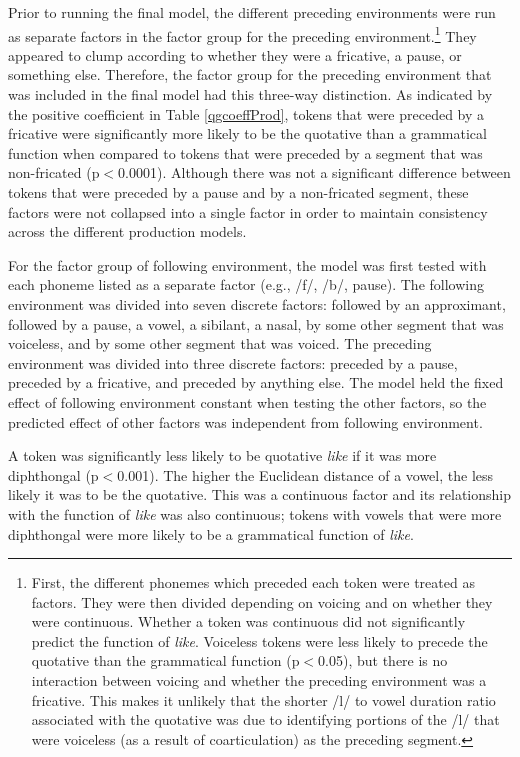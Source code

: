Prior to running the final model, the different preceding environments were run as separate factors in the factor group for the preceding environment.\footnote{First, the different phonemes which preceded each token were treated as factors.  They were then divided depending on voicing and on whether they were continuous.  Whether a token was continuous did not significantly predict the function of \textit{like}.  Voiceless tokens were less likely to precede the quotative than the grammatical function (p$<$0.05), but there is no interaction between voicing and whether the preceding environment was a fricative.  This makes it unlikely that the shorter /l/ to vowel duration ratio associated with the quotative was due to identifying portions of the /l/ that were voiceless (as a result of coarticulation) as the preceding segment.}  They appeared to clump according to whether they were a fricative, a pause, or something else.  Therefore, the factor group for the preceding environment that was included in the final model had this three-way distinction.  As indicated by the positive coefficient in Table \ref{qgcoeffProd}, tokens that were preceded by a fricative were significantly more likely to be the quotative than a grammatical function when compared to tokens that were preceded by a segment that was non-fricated (p$<$0.0001).  Although there was not a significant difference between tokens that were preceded by a pause and by a non-fricated segment, these factors were not collapsed into a single factor in order to maintain consistency across the different production models.

For the factor group of following environment, the model was first tested with each phoneme listed as a separate factor (e.g., /f/, /b/, pause).  The following environment was divided into seven discrete factors: followed by an approximant, followed by a pause, a vowel, a sibilant, a nasal, by some other segment that was voiceless, and by some other segment that was voiced.  The preceding environment was divided into three discrete factors: preceded by a pause, preceded by a fricative, and preceded by anything else.  The model held the fixed effect of following environment constant when testing the other factors, so the predicted effect of other factors was independent from following environment.  

A token was significantly less likely to be quotative \textit{like} if it was more diphthongal (p$<$0.001).  The higher the Euclidean distance of a vowel, the less likely it was to be the quotative. This was a continuous factor and its relationship with the function of \textit{like} was also continuous; tokens with vowels that were more diphthongal were more likely to be a grammatical function of \textit{like}.   


